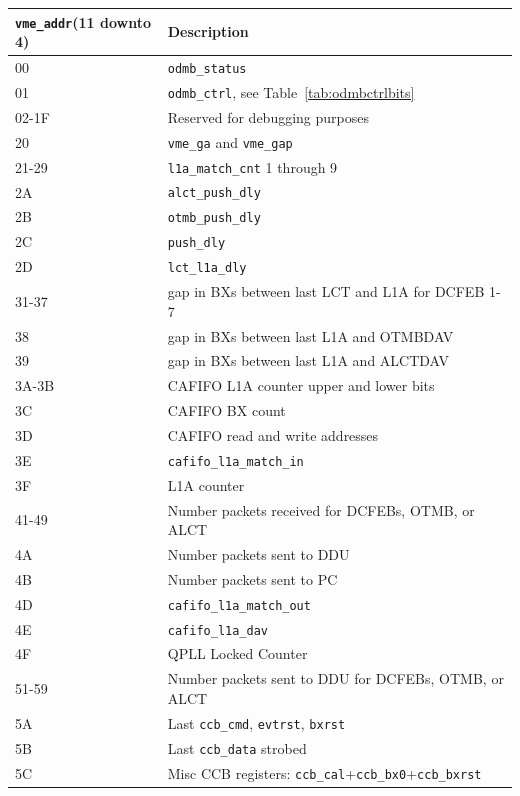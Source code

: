 \documentclass[10pt,a4paper]{article}
\begin{document}
\begin{table}[H]
\centering
\begin{tabular}{|l|l|} \hline
\texttt{vme\_addr}(11 downto 4)&  Description\\ \hline
00& \texttt{odmb\_status}\\ \hline
01& \texttt{odmb\_ctrl}, see Table~\ref{tab:odmbctrlbits}\\ \hline
02-1F& Reserved for debugging purposes\\ \hline
20& \texttt{vme\_ga} and \texttt{vme\_gap}\\ \hline
21-29& \texttt{l1a\_match\_cnt} 1 through 9\\ \hline
2A& \texttt{alct\_push\_dly}\\ \hline
2B& \texttt{otmb\_push\_dly}\\ \hline
2C& \texttt{push\_dly}\\ \hline
2D& \texttt{lct\_l1a\_dly}\\ \hline
31-37& gap in BXs between last LCT and L1A for DCFEB 1-7\\ \hline
38& gap in BXs between last L1A and OTMBDAV\\ \hline
39& gap in BXs between last L1A and ALCTDAV\\ \hline
3A-3B& CAFIFO L1A counter upper and lower bits\\ \hline
3C& CAFIFO BX count\\ \hline
3D& CAFIFO read and write addresses\\ \hline
3E& \texttt{cafifo\_l1a\_match\_in}\\ \hline
3F& L1A counter\\ \hline
41-49& Number packets received for DCFEBs, OTMB, or ALCT\\ \hline
4A& Number packets sent to DDU\\ \hline
4B& Number packets sent to PC\\ \hline
4D& \texttt{cafifo\_l1a\_match\_out}\\ \hline
4E& \texttt{cafifo\_l1a\_dav}\\ \hline
4F& QPLL Locked Counter\\ \hline
51-59& Number packets sent to DDU for DCFEBs, OTMB, or ALCT\\ \hline
5A& Last \texttt{ccb\_cmd}, \texttt{evtrst}, \texttt{bxrst}\\ \hline
5B& Last \texttt{ccb\_data} strobed\\ \hline
5C& Misc CCB registers: \texttt{ccb\_cal}+\texttt{ccb\_bx0}+\texttt{ccb\_bxrst}\\

\end{tabular}
\end{table}
\end{document}
